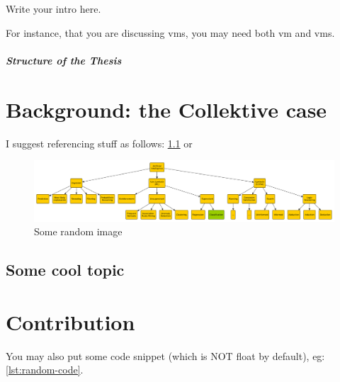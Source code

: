 \documentclass[12pt,a4paper,openright,twoside]{book}
\begin{document}
Write your intro here.

For instance,
that you are discussing \acp{vm},
you may need both \ac{vm} and \acp{vm}.

\paragraph{Structure of the Thesis}





\chapter{Background: the Collektive case}
\label{chap:background}

I suggest referencing stuff as follows: \cref{fig:random-image} or 

\begin{figure}
    \centering
    \includegraphics[width=.8\linewidth]{figures/random-image.pdf}
    \caption{Some random image}
    \label{fig:random-image}
\end{figure}

\section{Some cool topic}

\chapter{Contribution}
\label{chap:contribution}

You may also put some code snippet (which is NOT float by default), eg: \cref{lst:random-code}.
\end{document}
